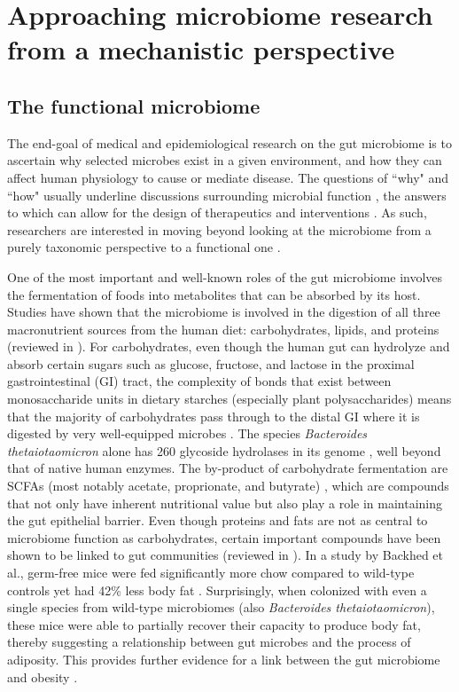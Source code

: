 \section{Approaching microbiome research from a mechanistic perspective}

\subsection{The functional microbiome}

The end-goal of medical and epidemiological research on the gut microbiome is to ascertain why selected microbes exist in a given environment, and how they can affect human physiology to cause or mediate disease. The questions of ``why" and ``how" usually underline discussions surrounding microbial function \cite{klassen2018defining}, the answers to which can allow for the design of therapeutics and interventions \cite{durack2019gut}. As such, researchers are interested in moving beyond looking at the microbiome from a purely taxonomic perspective to a functional one \cite{heintz-buschart2018human}.  

One of the most important and well-known roles of the gut microbiome involves the fermentation of foods into metabolites that can be absorbed by its host. Studies have shown that the microbiome is involved in the digestion of all three macronutrient sources from the human diet: carbohydrates, lipids, and proteins (reviewed in \cite{oliphant2019macronutrient}). For carbohydrates, even though the human gut can hydrolyze and absorb certain sugars such as glucose, fructose, and lactose in the proximal gastrointestinal (GI) tract, the complexity of bonds that exist between monosaccharide units in dietary starches (especially plant polysaccharides) means that the majority of carbohydrates pass through to the distal GI where it is digested by very well-equipped microbes \cite{wong2006colonic}. The species \emph{Bacteroides thetaiotaomicron} alone has 260 glycoside hydrolases in its genome \cite{xu2003genomic}, well beyond that of native human enzymes. The by-product of carbohydrate fermentation are SCFAs (most notably acetate, proprionate, and butyrate) \cite{macfarlane2012bacteria}, which are compounds that not only have inherent nutritional value but also play a role in maintaining the gut epithelial barrier. Even though proteins and fats are not as central to microbiome function as carbohydrates, certain important compounds have been shown to be linked to gut communities (reviewed in \cite{morowitz2011contributions}). In a study by Backhed et al., germ-free mice were fed significantly more chow compared to wild-type controls yet had 42\% less body fat \cite{backhed2004gut}. Surprisingly, when colonized with even a single species from wild-type microbiomes (also \emph{Bacteroides thetaiotaomicron}), these mice were able to partially recover their capacity to produce body fat, thereby suggesting a relationship between gut microbes and the process of adiposity. This provides further evidence for a link between the gut microbiome and obesity \cite{turnbaugh2009core}. 

